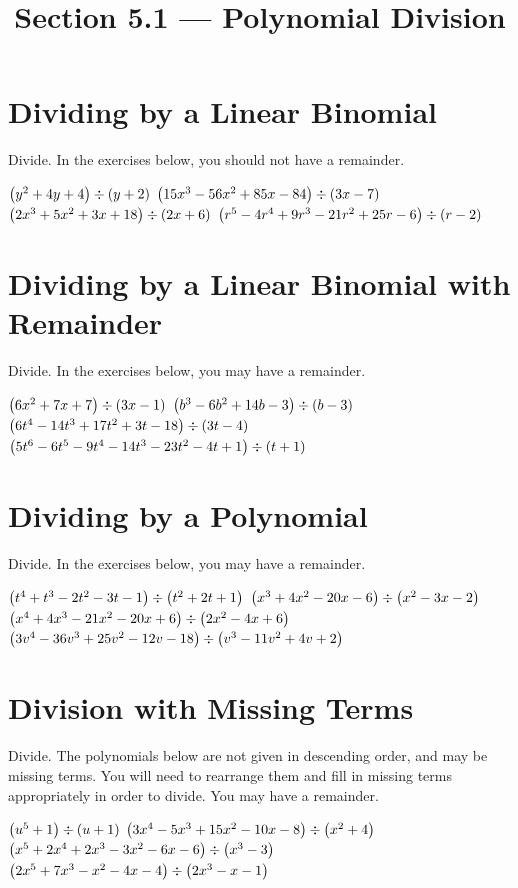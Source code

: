 

\title{Section 5.1 --- Polynomial Division}


\maketitle

\section*{Dividing by a Linear Binomial}
Divide.  In the exercises below, you should not have a remainder.
\begin{smenum}
\mitemxx
{$\left(y^2+4y+4\right)\div\left(y+2\right)$}
{$\left(15 x^3-56 x^2+85 x-84\right)\div\left(3x-7\right)$}
\mitemxx
{$\left(2 x^3+5 x^2+3 x+18\right)\div\left(2x+6\right)$}
{$\left(r^5-4 r^4+9 r^3-21 r^2+25 r-6\right)\div\left(r-2\right)$}
\end{smenum}

\section*{Dividing by a Linear Binomial with Remainder}
Divide.  In the exercises below, you may have a remainder.
\begin{smenum}
\mitemxx
{$\left(6x^2+7x+7\right)\div\left(3x-1\right)$}
{$\left(b^3-6b^2+14b-3\right)\div\left(b-3\right)$}
\mitemxx
{$\left(6 t^4-14 t^3+17 t^2+3 t-18\right)\div\left(3t-4\right)$}
{$\left(5 t^6-6 t^5-9 t^4-14 t^3-23 t^2-4 t+1\right)\div\left(t+1\right)$}
\end{smenum}

\section*{Dividing by a Polynomial}
Divide.  In the exercises below, you may have a remainder.
\begin{smenum}
\mitemxx
{$\left(t^4+t^3-2 t^2-3 t-1\right)\div\left(t^2+2t+1\right)$}
{$\left(x^3+4 x^2-20 x-6\right)\div\left(x^2-3x-2\right)$}
\mitemx
{$\left(x^4+4 x^3-21 x^2-20 x+6\right)\div\left(2x^2-4x+6\right)$}
\mitemx
{$\left(3 v^4-36 v^3+25 v^2-12 v-18\right)\div\left(v^3-11v^2+4v+2\right)$}
\end{smenum}


\section*{Division with Missing Terms}
Divide.  The polynomials below are not given in descending order, and may be missing terms.  You will need to rearrange them and fill in missing terms appropriately in order to divide.  You may have a remainder.
\begin{smenum}
\mitemxx
{$\left(u^5+1\right)\div\left(u+1\right)$}
{$\left(3 x^4-5 x^3+15 x^2-10 x-8\right)\div\left(x^2+4\right)$}
\mitemxx
{$\left(x^5+2 x^4+2 x^3-3 x^2-6 x-6\right)\div\left(x^3-3\right)$}
{$\left(2 x^5+7 x^3-x^2-4 x-4\right)\div\left(2x^3-x-1\right)$}
\end{smenum}

